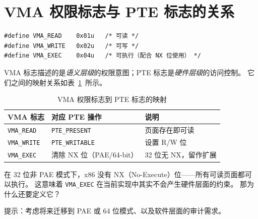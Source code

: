\section{VMA 权限标志与 PTE 标志的关系}
\label{sec:vma-flags}

\begin{lstlisting}[style=cstyle]
#define VMA_READ    0x01u   /* 可读 */
#define VMA_WRITE   0x02u   /* 可写 */
#define VMA_EXEC    0x04u   /* 可执行（配合 NX 位使用） */
\end{lstlisting}

VMA 标志描述的是\emph{语义层级}的权限意图；PTE 标志是\emph{硬件层级}的访问控制。
它们之间的映射关系如表~\ref{tab:vma-pte-flags}~所示。

\begin{table}[H]
\centering
\begin{tabular}{lll}
\toprule
\textbf{VMA 标志} & \textbf{对应 PTE 操作} & \textbf{说明} \\
\midrule
\texttt{VMA\_READ}  & \texttt{PTE\_PRESENT}   & 页面存在即可读 \\
\texttt{VMA\_WRITE} & \texttt{PTE\_WRITABLE}  & 设置 R/W 位 \\
\texttt{VMA\_EXEC}  & 清除 NX 位（PAE/64-bit） & 32 位无 NX，留作扩展 \\
\bottomrule
\end{tabular}
\caption{VMA 权限标志到 PTE 标志的映射}
\label{tab:vma-pte-flags}
\end{table}

\begin{thinkbox}
在 32 位非 PAE 模式下，x86 没有 NX（No-Execute）位——所有可读页面都可以执行。
这意味着 \texttt{VMA\_EXEC} 在当前实现中其实不会产生硬件层面的约束。
那为什么还要定义它？

提示：考虑将来迁移到 PAE 或 64 位模式、以及软件层面的审计需求。
\end{thinkbox}


